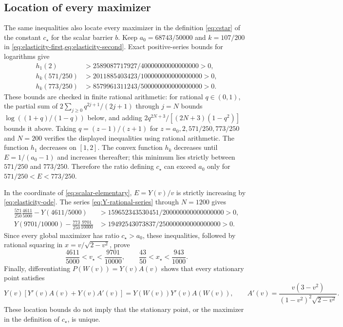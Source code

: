 \subsection{Location of every maximizer}
The same inequalities also locate every maximizer in the definition
\eqref{eq:cstar} of the constant $c_\star$ for the scalar barrier $b$. Keep $a_0=68743/50000$
and $k=107/200$ in \cref{eq:elasticity-first,eq:elasticity-second}.
Exact positive-series bounds for logarithms give
\begin{align*}
 h_1(2)&>2589087717927/40000000000000000>0,\\
 h_k(571/250)&>2011885403423/100000000000000000>0,\\
 h_k(773/250)&>8579961311243/500000000000000000>0.
\end{align*}
These bounds are checked in finite rational arithmetic: for rational $q\in(0,1)$,
the partial sum of $2\sum_{j\geq0}q^{2j+1}/(2j+1)$ through
$j=N$ bounds $\log((1+q)/(1-q))$ below, and adding
$2q^{2N+3}/[(2N+3)(1-q^2)]$ bounds it above. Taking
$q=(z-1)/(z+1)$ for $z=a_0,2,571/250,773/250$ and $N=200$
verifies the displayed inequalities using rational arithmetic.
The function $h_1$ decreases on $[1,2]$. The convex function
$h_k$ decreases until $E=1/(a_0-1)$ and increases thereafter;
this minimum lies strictly between $571/250$ and $773/250$.
Therefore the ratio defining $c_\star$ can exceed $a_0$ only for
$571/250<E<773/250$.

In the coordinate of \eqref{eq:scalar-elementary}, $E=Y(v)/v$
is strictly increasing by \eqref{eq:elasticity-ode}.
The series \eqref{eq:Y-rational-series} through $N=1200$ gives
\begin{align*}
 \frac{571}{250}\frac{4611}{5000}-Y(4611/5000)
 &>159652343530451/200000000000000000>0,\\
 Y(9701/10000)-\frac{773}{250}\frac{9701}{10000}
 &>19492543073837/250000000000000000>0.
\end{align*}
Since every global maximizer has ratio $c_\star>a_0$, these
inequalities, followed by rational squaring in
$x=v/\sqrt{2-v^2}$, prove
\begin{equation}
 \frac{4611}{5000}<v_\star<\frac{9701}{10000},\qquad
 \frac{43}{50}<x_\star<\frac{943}{1000}.
 \label{eq:cstar-maximizer-location}
\end{equation}
Finally,
differentiating $P(W(v))=Y(v)A(v)$ shows that every stationary
point satisfies
\[
 Y(v)[Y'(v)A(v)+Y(v)A'(v)]
 =Y(W(v))Y'(v)A(W(v)),\qquad
 A'(v)=\frac{v(3-v^2)}{(1-v^2)^2\sqrt{2-v^2}}.
\]
These location bounds do not imply that the stationary point, or the
maximizer in the definition of $c_\star$, is unique.
